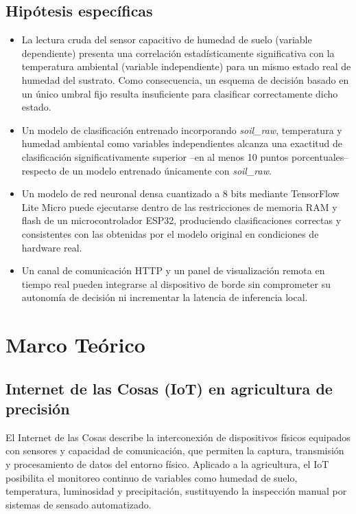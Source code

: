 \documentclass[12pt,a4paper]{article}
\begin{document}
\subsection{Hipótesis específicas}
\begin{itemize}
    \item[$H_1$:] La lectura cruda del sensor capacitivo de humedad de suelo (variable dependiente) presenta una correlación estadísticamente significativa con la temperatura ambiental (variable independiente) para un mismo estado real de humedad del sustrato. Como consecuencia, un esquema de decisión basado en un único umbral fijo resulta insuficiente para clasificar correctamente dicho estado.
    \item[$H_2$:] Un modelo de clasificación entrenado incorporando \textit{soil\_raw}, temperatura y humedad ambiental como variables independientes alcanza una exactitud de clasificación significativamente superior --en al menos 10 puntos porcentuales-- respecto de un modelo entrenado únicamente con \textit{soil\_raw}.
    \item[$H_3$:] Un modelo de red neuronal densa cuantizado a 8 bits mediante TensorFlow Lite Micro puede ejecutarse dentro de las restricciones de memoria RAM y flash de un microcontrolador ESP32, produciendo clasificaciones correctas y consistentes con las obtenidas por el modelo original en condiciones de hardware real.
    \item[$H_4$:] Un canal de comunicación HTTP y un panel de visualización remota en tiempo real pueden integrarse al dispositivo de borde sin comprometer su autonomía de decisión ni incrementar la latencia de inferencia local.
\end{itemize}

\section{Marco Teórico}

\subsection{Internet de las Cosas (IoT) en agricultura de precisión}
El Internet de las Cosas describe la interconexión de dispositivos físicos equipados con sensores y capacidad de comunicación, que permiten la captura, transmisión y procesamiento de datos del entorno físico. Aplicado a la agricultura, el IoT posibilita el monitoreo continuo de variables como humedad de suelo, temperatura, luminosidad y precipitación, sustituyendo la inspección manual por sistemas de sensado automatizado.
\end{document}
